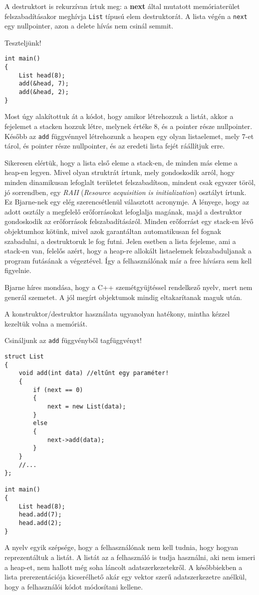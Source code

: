 \documentclass[a4paper,11.5pt,table]{article}
\begin{document}
	\medskip
	A destruktort is rekurzívan írtuk meg: a \textbf{next} által mutatott memóriaterület felszabadításakor meghívja \texttt{List} típusú elem destruktorát. A lista végén a \texttt{next} egy nullpointer, azon a delete hívás nem csinál semmit.
	
	\medskip
	Teszteljünk!
	\begin{lstlisting}
int main()
{
	List head(8);
	add(&head, 7);
	add(&head, 2);
}
	\end{lstlisting}
	Most úgy alakítottuk át a kódot, hogy amikor létrehozzuk a listát, akkor a fejelemet a stacken hozzuk létre, melynek értéke 8, és a pointer része nullpointer. Később az \texttt{add} függvénnyel létrehozunk a heapen egy olyan listaelemet, mely 7-et tárol, és pointer része nullpointer, és az eredeti lista fejét ráállítjuk erre.
	\medskip
	
	Sikeresen elértük, hogy a lista első eleme a stack-en, de minden más eleme a heap-en legyen. Mivel olyan struktrát írtunk, mely gondoskodik arról, hogy minden dinamikusan lefoglalt területet felszabadítson, mindent csak egyszer töröl, jó sorrendben, egy  \textit{RAII} (\textit{Resource acquisition is initialization}) osztályt írtunk. Ez Bjarne-nek egy elég szerencsétlenül választott acronymje. A lényege, hogy az adott osztály a megfelelő erőforrásokat lefoglalja magának, majd a destruktor gondoskodik az erőforrások felszabadításáról. Minden erőforrást egy stack-en lévő objektumhoz kötünk, mivel azok garantáltan automatikusan fel fognak szabadulni, a destruktoruk le fog futni. Jelen esetben a lista fejeleme, ami a stack-en van, felelős azért, hogy a heap-re allokált listaelemek felszabaduljanak a program futásának a végeztével. Így a felhasználónak már a free hívásra sem kell figyelnie.
	
	Bjarne híres mondása, hogy a C++ szemétgyüjtéssel rendelkező nyelv, mert nem generál szemetet. A jól megírt objektumok mindig eltakarítanak maguk után. 
	\medskip
	
	A konstruktor/destruktor használata ugyanolyan hatékony, mintha kézzel kezeltük volna a memóriát.
	
	\medskip
	Csináljunk az \texttt{add} függvényből tagfüggvényt!
	\begin{lstlisting}
struct List
{	
	void add(int data) //eltűnt egy paraméter!
	{
		if (next == 0)
		{
			next = new List(data);
		}
		else
		{
			next->add(data);
		}
	}
	//...
};

int main()
{
	List head(8);
	head.add(7);
	head.add(2);
}
	\end{lstlisting}
	A nyelv egyik szépsége, hogy a felhasználónak nem kell tudnia, hogy hogyan reprezentáltuk a listát. A listát az a felhasználó is tudja használni, aki nem ismeri a heap-et, nem hallott még soha láncolt adatszerkezetekről. A későbbiekben a lista prerezentációja kicserélhető akár egy vektor szerű adatszerkezetre anélkül, hogy a felhasználói kódot módosítani kellene.
	\medskip
	
\end{document}
